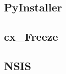 
\begin{issues}
\issueDraft
\end{issues}

\subsection{PyInstaller}

\subsection{cx_Freeze}

\subsection{NSIS}
